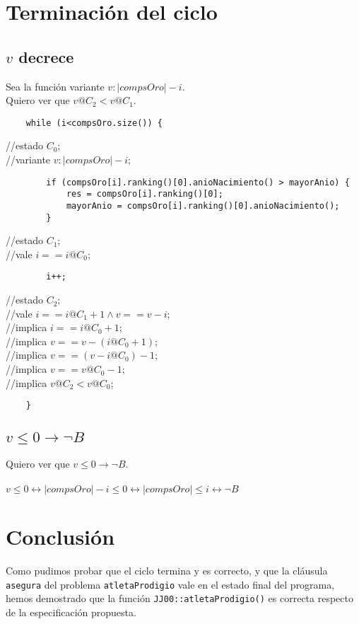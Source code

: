 \documentclass[a4paper]{article}
\begin{document}
\pagebreak

\section{Terminaci\'on del ciclo}

\subsection{$v$ decrece}

Sea la funci\'on variante $v: |compsOro|-i$.
\\
Quiero ver que $v@C_{2} < v@C_{1}$.

\begin{lstlisting}
	while (i<compsOro.size()) {
\end{lstlisting}
//estado $C_{0}$;
\\
//variante $v: |compsOro|-i$;
\begin{lstlisting}
		if (compsOro[i].ranking()[0].anioNacimiento() > mayorAnio) {
			res = compsOro[i].ranking()[0];
			mayorAnio = compsOro[i].ranking()[0].anioNacimiento();
		}
\end{lstlisting}
//estado $C_{1}$;
\\
//vale $i == i@C_{0}$;
\begin{lstlisting}
		i++;
\end{lstlisting}
//estado $C_{2}$;
\\
//vale $i == i@C_{1}+1 \land v == v-i$;
\\
//implica $i == i@C_{0}+1$;
\\
//implica $v == v-(i@C_{0}+1)$;
\\
//implica $v == (v-i@C_{0})-1$;
\\
//implica $v == v@C_{0}-1$;
\\
//implica $v@C_{2} < v@C_{0}$;
\begin{lstlisting}
	}
\end{lstlisting}

\subsection{$v \leq 0 \rightarrow \lnot B$}

Quiero ver que $v \leq 0 \rightarrow \lnot B$.
\\
\\
$v \leq 0 \leftrightarrow |compsOro| - i \leq 0 \leftrightarrow |compsOro| \leq i \leftrightarrow \lnot B$

\section{Conclusi\'on}

Como pudimos probar que el ciclo termina y es correcto, y que la cl\'ausula \texttt{asegura} del problema \texttt{atletaProdigio} vale en el estado final del programa, hemos demostrado que la funci\'on \texttt{JJ00::atletaProdigio()} es correcta respecto de la especificaci\'on propuesta.
\end{document}
